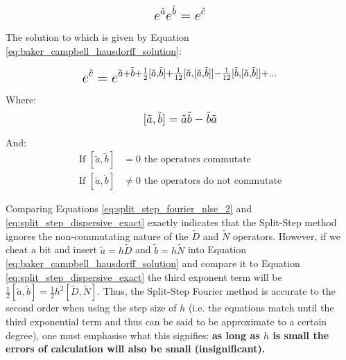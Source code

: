 \documentclass[colorlinks,11pt,a4paper,normalphoto,withhyper,ragged2e]{altareport}
\begin{document}
		\begin{equation} \label{eq:baker_campbell_hausdorff}
			\mathlarger{\mathlarger{ e^{\tilde{a}} e^{\tilde{b}} = e^{\tilde{c}} }}
		\end{equation}
		
		
		\vspace{5mm}
		
		
		The solution to which is given by Equation \ref{eq:baker_campbell_hausdorff_solution}:
		
		\begin{equation} \label{eq:baker_campbell_hausdorff_solution}
			\mathlarger{\mathlarger{ e^{\tilde{c}} = e^{\tilde{a} + \tilde{b} + \frac{1}{2}[\tilde{a}, \tilde{b}] + \frac{1}{12}[\tilde{a}, [\tilde{a}, \tilde{b}]] - \frac{1}{12}[\tilde{b}, [\tilde{a}, \tilde{b}]] + \dots} }}
		\end{equation}
		
		
		\vspace{5mm}
		
		 
		Where:
		\begin{equation}
			\mathlarger{ [\tilde{a}, \tilde{b}] = \tilde{a} \tilde{b} - \tilde{b} \tilde{a} } \nonumber
		\end{equation}
		
		And:		
		\begin{align}
			\text{If } [\tilde{a}, \tilde{b}] & = 0 \text{ the operators commutate} \nonumber\\
			\text{If } [\tilde{a}, \tilde{b}] & \neq 0 \text{ the operators do not commutate} \nonumber
		\end{align}
		
		
		\vspace{5mm}
		
		
		Comparing Equations \ref{eq:split_step_fourier_nlse_2} and \ref{eq:split_step_dispersive_exact} exactly indicates that the Split-Step method ignores the non-commutating nature of the $\tilde{D}$ and $\tilde{N}$ operators. However, if we cheat a bit and insert $\tilde{a} = h \tilde{D} $ and $\tilde{b} = h \tilde{N} $ into Equation \ref{eq:baker_campbell_hausdorff_solution} and compare it to Equation \ref{eq:split_step_dispersive_exact} the third exponent term will be $\frac{1}{2}[\tilde{a}, \tilde{b}] = \frac{1}{2} h^2 [\tilde{D}, \tilde{N}]$. Thus, the Split-Step Fourier method is accurate to the second order when using the step size of $h$ (i.e. the equations match until the third exponential term and thus can be said to be approximate to a certain degree), one must emphasise what this signifies: \textbf{as long as $h$ is small the errors of calculation will also be small (insignificant).}
	
\end{document}
